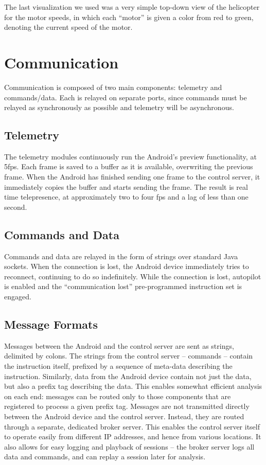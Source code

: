 \documentclass[letterpaper]{article}
\begin{document}
The last visualization we used was a very simple top-down view of the
helicopter for the motor speeds, in which each ``motor'' is given a
color from red to green, denoting the current speed of the motor.

\section{Communication}
Communication is composed of two main components: telemetry and
commands/data. Each is relayed on separate ports, since commands must
be relayed as synchronously as possible and telemetry will be
asynchronous.

\subsection{Telemetry}
The telemetry modules continuously run the Android's preview
functionality, at 5fps.  Each frame is saved to a buffer as it is
available, overwriting the previous frame.  When the Android has
finished sending one frame to the control server, it immediately
copies the buffer and starts sending the frame.  The result is real
time telepresence, at approximately two to four fps and a lag of
less than one second.

\subsection{Commands and Data}
Commands and data are relayed in the form of strings over standard
Java sockets. When the connection is lost, the Android device
immediately tries to reconnect, continuing to do so indefinitely.
While the connection is lost, autopilot is enabled and the
``communication lost'' pre-programmed instruction set is engaged.

\subsection{Message Formats}
\label{sec:msgs}
‏Messages between the Android and the control server are sent as
strings, delimited by colons. The strings from the control server --
commands -- contain the instruction itself, prefixed by a sequence of
meta-data describing the instruction. Similarly, data from the Android
device contain not just the data, but also a prefix tag describing the
data. This enables somewhat efficient analysis on each end: messages can
be routed only to those components that are registered to process a
given prefix tag.  Messages are not transmitted directly between the
Android device and the control server. Instead, they are routed through
a separate, dedicated broker server. This enables the control server
itself to operate easily from different IP addresses, and hence from
various locations. It also allows for easy logging and playback of
sessions -- the broker server logs all data and commands, and can replay
a session later for analysis.
\end{document}
